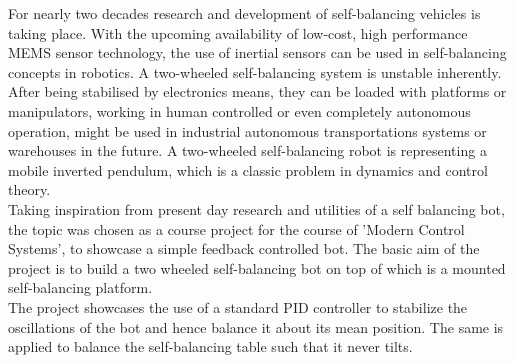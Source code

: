 \setcounter{page}{1}
\thispagestyle{empty}

For nearly two decades research and development of self-balancing vehicles is taking place. With the upcoming availability of low-cost, high performance MEMS sensor technology, the use of inertial sensors can be used in self-balancing concepts in robotics.
A two-wheeled self-balancing system is unstable inherently.\\

After being stabilised by electronics means, they can be loaded with platforms or manipulators, working in human controlled or even completely autonomous operation, might be used in industrial autonomous transportations systems or warehouses in the future.
A two-wheeled self-balancing robot is representing a mobile inverted pendulum, which is a classic problem in dynamics and control theory.\\

Taking inspiration from present day research and utilities of a self balancing bot, the topic was chosen as a course project for the course of 'Modern Control Systems', to showcase a simple feedback controlled bot. The basic aim of the project is to build a two wheeled self-balancing bot on top of which is a mounted self-balancing platform.\\

The project showcases the use of a standard PID controller to stabilize the oscillations of the bot and hence balance it about its mean position. The same is applied to balance the self-balancing table such that it never tilts.\\
